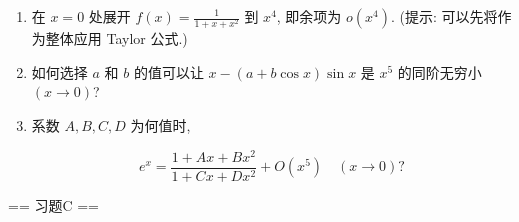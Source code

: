 \begin{enumerate}
\begin{solution}
\begin{enumerate}
\[\begin{aligned}
            &\quad\lim_{x\to 0}\frac{\sinh\tan{x}-x}{x^3}=\lim_{x\to 0}\frac{e^{\tan{x}}-e^{-\tan{x}}-2x}{2x^3}\\
            &=\lim_{x\to 0}\frac{\left(1+\tan{x}+\frac{1}{2!}\tan^2{x}+\frac{1}{3!}\tan^3{x}+o(x^3)\right)-\left(1-\tan{x}+\frac{1}{2!}\tan^2{x}-\frac{1}{3!}\tan^3{x}+o(x^3)\right)-2x}{2x^3}\\
            &=\lim_{x\to 0}\frac{2\tan{x}+\frac{1}{3}\tan^3{x}-2x}{2x^3}=\lim_{x\to 0}\frac{2\left(x+\frac{x^3}{3}+o(x^3)\right)+\frac{1}{3}\left(x^3+o(x^3)\right)-2x}{2x^3}=\frac{1}{2}.
            \end{aligned}
            \]
            \item[(h)]\\
            \[
            \begin{aligned}
            &\quad\lim_{x\to 0}\frac{a^x+a^{-x}-2}{x^2}=\lim_{x\to 0}\frac{e^{x \ln a} + e^{-x \ln a} - 2}{x^2}=\lim_{x\to 0}\frac{2 \cosh(x \ln a) - 2}{x^2}\\
            &=\lim_{x\to 0}\frac{2\left(1+\frac{1}{2}\left(x\ln a\right)^2+o(x^2)\right)}{x^2}=\ln^2a.
            \end{aligned}
            \]
        \end{enumerate}
    \end{solution}

    \item[2.]在 $x = 0$ 处展开 $\displaystyle f(x) = \frac{1}{1 + x + x^2}$ 到 $x^4$, 即余项为 $\displaystyle o(x^4)$. 
    (提示: 可以先将作为整体应用 Taylor 公式.)
    \item[3.]如何选择 $a$ 和 $b$ 的值可以让 $\displaystyle x - (a + b \cos x) \sin x$ 是 $x^5$ 的同阶无穷小 $(x \to 0)$?
    \item[4.]系数 $A, B, C, D$ 为何值时,

\[\displaystyle e^x = \frac{1 + Ax + Bx^2}{1 + Cx + Dx^2} + O(x^5) \quad (x \to 0)?\]
\end{enumerate}

== 习题C ==

